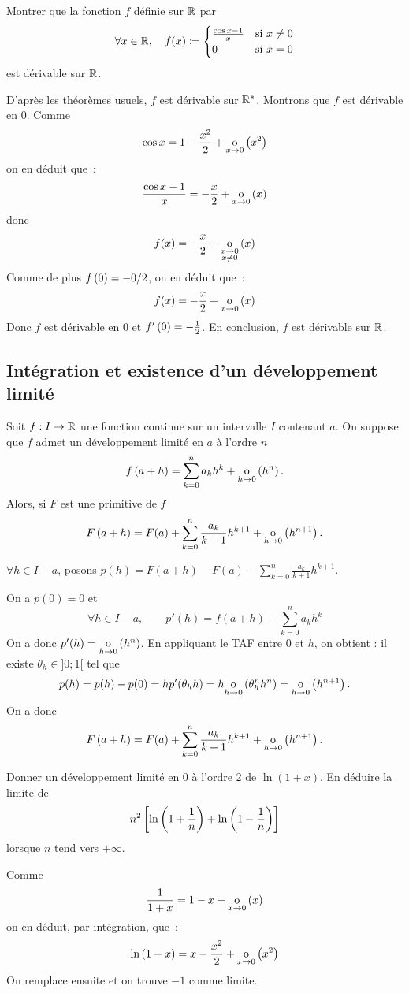 \documentclass{magnoliaold}
\begin{document}
\begin{exoUnique}
\exo Montrer que la fonction $f$ définie sur $\mathbb{R}$ par
  \[\forall x\in\mathbb{R} ,\quad f(x)\coloneqq
    \begin{cases}
    \frac{\cos x-1}{x} & \text{si $x\neq 0$}\\
    0 & \text{si $x=0$}
    \end{cases}\]
  est dérivable sur $\mathbb{R}$.
\begin{sol}
   D'après les théorèmes
   usuels, $f$ est dérivable sur ${\mathbb{R}^*}$. Montrons que $f$ est dérivable en 0.
   Comme
   \[\cos x=1-\frac{x^2}{2}+\underset{x \rightarrow 0}{\text{o}}\left(x^2\right)\]
   on en déduit que~:
   \[\frac{\cos x-1}{x}=-\frac{x}{2}+\underset{x \rightarrow 0}{\text{o}}\left(x\right)\]
   donc
   \[f(x)=-\frac{x}{2}+\underset{\substack{x \rightarrow 0\\x\neq 0}}{\text{o}} \left(x\right)\]
   Comme de plus $f\left(0\right)=-0/2$, on en déduit que~:
   \[f(x)=-\frac{x}{2}+\underset{x \rightarrow 0}{\text{o}}\left(x\right)\]
   Donc $f$ est dérivable en 0 et $f'\left(0\right)=-\frac{1}{2}$. En conclusion, $f$ est
   dérivable sur $\mathbb{R}$.
\end{sol}
\end{exoUnique}

\subsection{Intégration et existence d'un développement limité}

\begin{proposition}[utile=-3]
Soit $f:I\to\mathbb{R}$ une fonction continue sur un intervalle $I$ contenant $a$. On suppose que
$f$ admet un développement limité en $a$ à l'ordre $n$
\[f\left(a+h\right)=\sum_{k=0}^n a_k h^k+\underset{h \rightarrow 0}{\text{o}}\left(h^n\right).\]
Alors, si $F$ est une primitive de $f$~
\[F\left(a+h\right)=F(a)+\sum_{k=0}^n \frac{a_k}{k+1} h^{k+1}+
  \underset{h \rightarrow 0}{\text{o}}\left(h^{n+1}\right).\]
\end{proposition}

\begin{preuve}
$\forall h \in I-a$, posons $p(h)=F(a+h)-F(a)-\displaystyle \sum_{k=0}^n \frac{a_k}{k+1} h^{k+1}$.

On a $p(0)=0$ et \[\forall h \in I-a, \qquad p'(h)=f(a+h)-\sum_{k=0}^n a_k h^k\]
On a donc $p'(h)=\underset{h \rightarrow 0}{\text{o}}\left(h^n\right)$. En appliquant le TAF entre $0$ et $h$, on obtient : il existe $\theta_h \in ]0;1[$ tel que \[p(h)=p(h)-p(0)=hp'(\theta_h h)=h\underset{h \rightarrow 0}{\text{o}}\left(\theta_h^n h^n\right)=\underset{h \rightarrow 0}{\text{o}}\left(h^{n+1}\right).\]
On a donc 
\[F\left(a+h\right)=F(a)+\sum_{k=0}^n \frac{a_k}{k+1} h^{k+1}+
  \underset{h \rightarrow 0}{\text{o}}\left(h^{n+1}\right).\]
  \end{preuve}

\begin{exoUnique}
\exo Donner un développement limité en 0 à l'ordre 2 de $\ln(1+x)$. En
  déduire la limite de
  \[n^2\left[\ln\left(1+\frac{1}{n}\right)+\ln\left(1-\frac{1}{n}\right)\right]\]
  lorsque $n$ tend vers $+\infty$.
  \begin{sol}
  Comme
  \[\frac{1}{1+x}=1-x+\underset{x \rightarrow 0}{\text{o}}\left(x\right)\]
  on en déduit, par intégration, que~:
  \[\ln\left(1+x\right)=x-\frac{x^2}{2}+\underset{x \rightarrow 0}{\text{o}}\left(x^2\right)\]  
  On remplace ensuite et on trouve $-1$ comme limite.  
  \end{sol}
\end{exoUnique}
\end{document}
